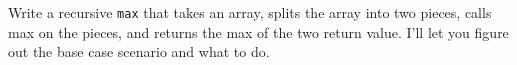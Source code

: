 Write a recursive \verb!max! that takes an array, splits the
array into two pieces, calls max on the pieces, and returns
the max of the two return value.
I'll let you figure out the base case scenario and what to do. 
